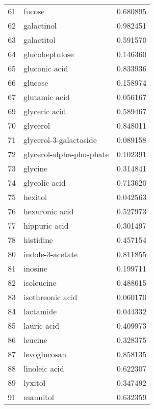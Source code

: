 \begin{tabular}{llr}
61  &                             fucose &  0.680895 \\
62  &                         galactinol &  0.982451 \\
63  &                         galactitol &  0.591570 \\
64  &                     glucoheptulose &  0.146360 \\
65  &                      gluconic acid &  0.833936 \\
66  &                            glucose &  0.158974 \\
67  &                      glutamic acid &  0.056167 \\
69  &                      glyceric acid &  0.589467 \\
70  &                           glycerol &  0.848011 \\
71  &             glycerol-3-galactoside &  0.089158 \\
72  &           glycerol-alpha-phosphate &  0.102391 \\
73  &                            glycine &  0.314841 \\
74  &                      glycolic acid &  0.713620 \\
75  &                            hexitol &  0.042563 \\
76  &                     hexuronic acid &  0.527973 \\
77  &                      hippuric acid &  0.301497 \\
78  &                          histidine &  0.457154 \\
80  &                   indole-3-acetate &  0.811855 \\
81  &                            inosine &  0.199711 \\
82  &                         isoleucine &  0.488615 \\
83  &                   isothreonic acid &  0.060170 \\
84  &                          lactamide &  0.044332 \\
85  &                        lauric acid &  0.409973 \\
86  &                            leucine &  0.328375 \\
87  &                       levoglucosan &  0.858135 \\
88  &                      linoleic acid &  0.622307 \\
89  &                            lyxitol &  0.347492 \\
91  &                           mannitol &  0.632359 \\

\end{tabular}
